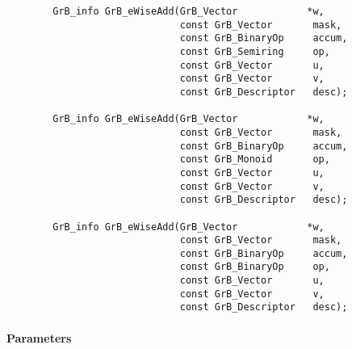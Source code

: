 \begin{verbatim}
        GrB_info GrB_eWiseAdd(GrB_Vector            *w,
                              const GrB_Vector       mask,
                              const GrB_BinaryOp     accum,
                              const GrB_Semiring     op, 
                              const GrB_Vector       u,
                              const GrB_Vector       v,
                              const GrB_Descriptor   desc);
                            
        GrB_info GrB_eWiseAdd(GrB_Vector            *w,
                              const GrB_Vector       mask,
                              const GrB_BinaryOp     accum,
                              const GrB_Monoid       op, 
                              const GrB_Vector       u,
                              const GrB_Vector       v,
                              const GrB_Descriptor   desc);

        GrB_info GrB_eWiseAdd(GrB_Vector            *w,
                              const GrB_Vector       mask,
                              const GrB_BinaryOp     accum,
                              const GrB_BinaryOp     op, 
                              const GrB_Vector       u,
                              const GrB_Vector       v,
                              const GrB_Descriptor   desc);
\end{verbatim}

\paragraph{Parameters}

